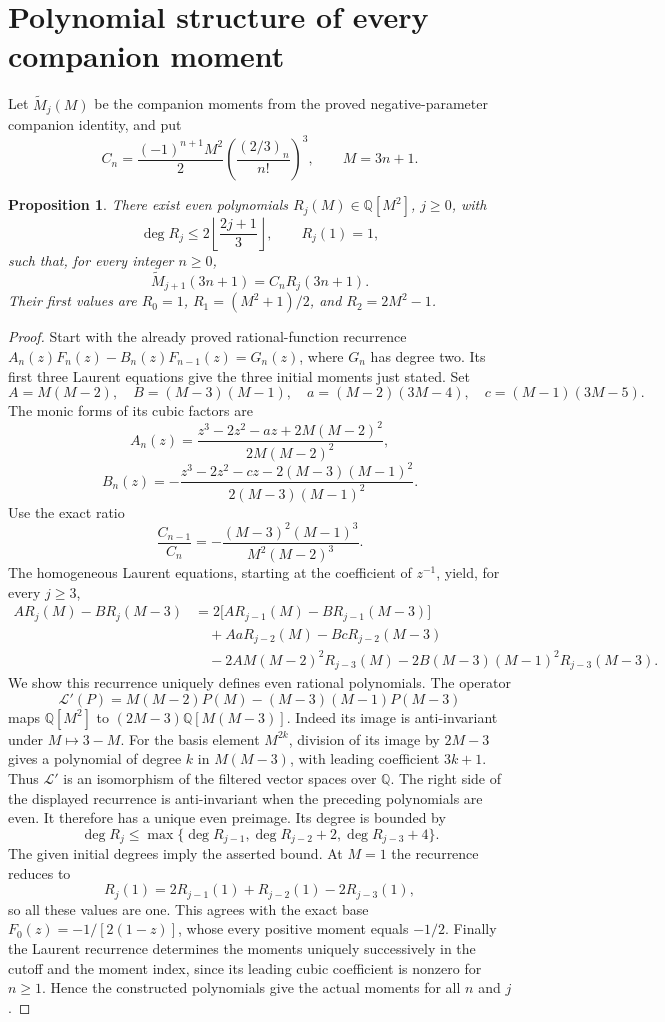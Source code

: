 \documentclass[11pt,letterpaper]{article}
\newtheorem{proposition}[theorem]{Proposition}
\numberwithin{equation}{section}
\begin{document}
\section{Polynomial structure of every companion moment}\label{loc-VII-6}
\label{VII-sec:e-companion-polynomials}
Let $\widetilde M_j(M)$ be the companion moments from the proved
negative-parameter companion identity, and put
\[
 C_n=\frac{(-1)^{n+1}M^2}{2}
       \left(\frac{(2/3)_n}{n!}\right)^3,\qquad M=3n+1.
\]
\begin{proposition}\label{VII-prop:e-companion-polynomials}
There exist even polynomials $R_j(M)\in\mathbb Q[M^2]$, $j\ge0$,
with
\[
 \deg R_j\le2\left\lfloor\frac{2j+1}{3}\right\rfloor,
 \qquad R_j(1)=1,
\]
such that, for every integer $n\ge0$,
\[
 \widetilde M_{j+1}(3n+1)=C_nR_j(3n+1).
\]
Their first values are
$R_0=1$, $R_1=(M^2+1)/2$, and $R_2=2M^2-1$.
\end{proposition}
\begin{proof}
Start with the already proved rational-function recurrence
$A_n(z)F_n(z)-B_n(z)F_{n-1}(z)=G_n(z)$, where $G_n$ has degree two.
Its first three Laurent equations give the three initial moments
just stated. Set
\[
 A=M(M-2),\quad B=(M-3)(M-1),\quad
 a=(M-2)(3M-4),\quad c=(M-1)(3M-5).
\]
The monic forms of its cubic factors are
\[
 A_n(z)=\frac{z^3-2z^2-az+2M(M-2)^2}{2M(M-2)^2},
\]
\[
 B_n(z)=-\frac{z^3-2z^2-cz-2(M-3)(M-1)^2}
                       {2(M-3)(M-1)^2}.
\]
Use the exact ratio
\[
 \frac{C_{n-1}}{C_n}
 =-\frac{(M-3)^2(M-1)^3}{M^2(M-2)^3}.
\]
The homogeneous Laurent equations, starting at the coefficient of
$z^{-1}$, yield, for every $j\ge3$,
\begin{align*}
 A R_j(M)-B R_j(M-3)
 &=2\bigl[A R_{j-1}(M)-B R_{j-1}(M-3)\bigr]\\
 &\quad+A a R_{j-2}(M)-B c R_{j-2}(M-3)\\
 &\quad-2A M(M-2)^2R_{j-3}(M)
       -2B(M-3)(M-1)^2R_{j-3}(M-3).
\end{align*}
We show this recurrence uniquely defines even rational polynomials.
The operator
\[
 \mathcal L'(P)=M(M-2)P(M)-(M-3)(M-1)P(M-3)
\]
maps $\mathbb Q[M^2]$ to $(2M-3)\mathbb Q[M(M-3)]$.
Indeed its image is anti-invariant under $M\mapsto3-M$.
For the basis element $M^{2k}$, division of its image by $2M-3$
gives a polynomial of degree $k$ in $M(M-3)$, with leading
coefficient $3k+1$. Thus $\mathcal L'$ is an isomorphism of the
filtered vector spaces over $\mathbb Q$.
The right side of the displayed recurrence is anti-invariant when
the preceding polynomials are even. It therefore has a unique even
preimage. Its degree is bounded by
\[
 \deg R_j\le\max\{\deg R_{j-1},\deg R_{j-2}+2,
                                    \deg R_{j-3}+4\}.
\]
The given initial degrees imply the asserted bound.
At $M=1$ the recurrence reduces to
\[
 R_j(1)=2R_{j-1}(1)+R_{j-2}(1)-2R_{j-3}(1),
\]
so all these values are one. This agrees with the exact base
$F_0(z)=-1/[2(1-z)]$, whose every positive moment equals $-1/2$.
Finally the Laurent recurrence determines the moments uniquely
successively in the cutoff and the moment index, since its leading
cubic coefficient is nonzero for $n\ge1$. Hence the constructed
polynomials give the actual moments for all $n$ and $j$.
\end{proof}
\end{document}
